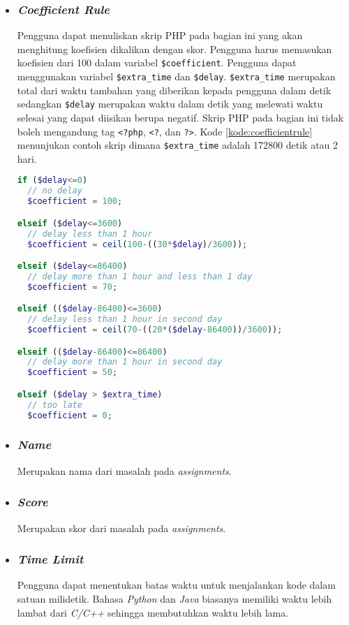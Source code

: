 \begin{itemize}
\item \subsubsection{\textit{Coefficient Rule}}
Pengguna dapat menuliskan skrip PHP pada bagian ini yang akan menghitung koefisien dikalikan dengan skor. Pengguna harus memasukan koefisien dari 100 dalam variabel \verb|$coefficient|. Pengguna dapat menggunakan variabel \verb|$extra_time| dan \verb|$delay|. \verb|$extra_time| merupakan total dari waktu tambahan yang diberikan kepada pengguna dalam detik sedangkan \verb|$delay| merupakan waktu dalam detik yang melewati waktu selesai yang dapat diisikan berupa negatif. Skrip PHP pada bagian ini tidak boleh mengandung tag \verb|<?php|, \verb|<?|, dan \verb|?>|. Kode \ref{kode:coefficientrule} menunjukan contoh skrip dimana \verb|$extra_time| adalah 172800 detik atau 2 hari.

\begin{lstlisting}[language=PHP, caption=Contoh skrip PHP, label=kode:coefficientrule]
if ($delay<=0)
  // no delay
  $coefficient = 100;

elseif ($delay<=3600)
  // delay less than 1 hour
  $coefficient = ceil(100-((30*$delay)/3600));

elseif ($delay<=86400)
  // delay more than 1 hour and less than 1 day
  $coefficient = 70;

elseif (($delay-86400)<=3600)
  // delay less than 1 hour in second day
  $coefficient = ceil(70-((20*($delay-86400))/3600));

elseif (($delay-86400)<=86400)
  // delay more than 1 hour in second day
  $coefficient = 50;

elseif ($delay > $extra_time)
  // too late
  $coefficient = 0;
\end{lstlisting}

\item \subsubsection{\textit{Name}}
Merupakan nama dari masalah pada \textit{assignments}.

\item \subsubsection{\textit{Score}}
Merupakan skor dari masalah pada \textit{assignments}. 

\item \subsubsection{\textit{Time Limit}}
Pengguna dapat menentukan batas waktu untuk menjalankan kode dalam satuan milidetik. Bahasa \textit{Python} dan \textit{Java} biasanya memiliki waktu lebih lambat dari \textit{C/C++} sehingga membutuhkan waktu lebih lama.


\end{itemize}
